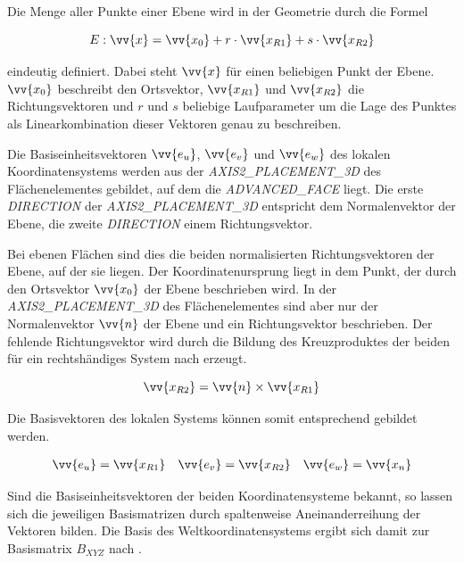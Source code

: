 Die Menge aller Punkte einer Ebene wird in der Geometrie durch die Formel

\begin{equation}
E: \vv{x} = \vv{x_{0}} + r \cdot \vv{x_{R1}} + s \cdot \vv{x_{R2}}  
\end{equation}

eindeutig definiert. Dabei steht $\vv{x}$ für einen beliebigen Punkt der Ebene. $\vv{x_{0}}$ beschreibt den Ortsvektor, $\vv{x_{R1}}$ und $\vv{x_{R2}}$  die Richtungsvektoren und $r$ und $s$ beliebige Laufparameter um die Lage des Punktes als Linearkombination dieser Vektoren genau zu beschreiben.

Die Basiseinheitsvektoren $\vv{e_{u}}$, $\vv{e_{v}}$ und $\vv{e_{w}}$ des lokalen Koordinatensystems werden aus der \textit{AXIS2\_PLACEMENT\_3D} des Flächenelementes gebildet, auf dem die \textit{ADVANCED\_FACE} liegt. Die erste \textit{DIRECTION} der \textit{AXIS2\_PLACEMENT\_3D} entspricht dem Normalenvektor der Ebene, die zweite \textit{DIRECTION} einem Richtungsvektor.

Bei ebenen Flächen sind dies die beiden normalisierten Richtungsvektoren der Ebene, auf der sie liegen. Der Koordinatenursprung liegt in dem Punkt, der durch den Ortsvektor $\vv{x_{0}}$ der Ebene beschrieben wird. In der \textit{AXIS2\_PLACEMENT\_3D} des Flächenelementes sind aber nur der Normalenvektor $\vv{n}$ der Ebene und ein Richtungsvektor beschrieben. Der fehlende Richtungsvektor wird durch die Bildung des Kreuzproduktes der beiden für ein rechtshändiges System nach  erzeugt.

\begin{equation}\label{eq:crossproduct}
	\vv{x_{R2}} = \vv{n} \times \vv{x_{R1}}
\end{equation}

Die Basisvektoren des lokalen Systems können somit entsprechend   gebildet werden.

\begin{equation}\label{eq:basevectorsuvw}
	\begin{aligned}
	\vv{e_{u}}=\vv{x_{R1}} 
	&& 
	\vv{e_{v}}=\vv{x_{R2}}  
	&& 
	\vv{e_{w}}=\vv{x_{n}} 
	\end{aligned}
\end{equation}

Sind die Basiseinheitsvektoren der beiden Koordinatensysteme bekannt, so lassen sich die jeweiligen Basismatrizen  durch spaltenweise Aneinanderreihung der Vektoren bilden. Die Basis des Weltkoordinatensystems ergibt sich damit zur Basismatrix $B_{XYZ}$ nach . 

